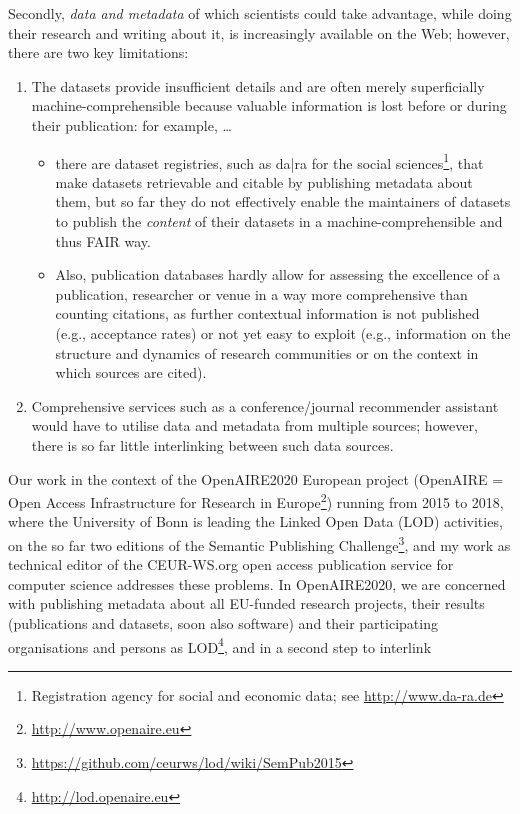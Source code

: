 \documentclass[a4paper,USenglish]{dagrep}
\begin{document}
Secondly, \emph{data and metadata} of which scientists could take advantage,
while doing their research and writing about it, is increasingly available on
the Web; however, there are two key limitations:
\begin{enumerate}
\item The datasets provide insufficient details and are often merely
superficially machine-comprehensible because valuable information is lost before
or during their publication: for example, …
  \begin{itemize}
  \item there are dataset registries, such as da|ra for the social
sciences\footnote{Registration agency for social and economic data; see
\url{http://www.da-ra.de}}, that make datasets retrievable and citable by
publishing metadata about them, but so far they do not effectively enable the
maintainers of datasets to publish the \emph{content} of their datasets in a
machine-comprehensible and thus FAIR way.
  \item Also, publication databases hardly allow for assessing the excellence of
a publication, researcher or venue in a way more comprehensive than counting
citations, as further contextual information is not published (e.g., acceptance
rates) or not yet easy to exploit (e.g., information on the structure and
dynamics of research communities or on the context in which sources are cited).
  \end{itemize}
\item Comprehensive services such as a conference/journal recommender assistant
would have to utilise data and metadata from multiple sources; however, there is
so far little interlinking between such data sources.
\end{enumerate}
Our work in the context of the OpenAIRE2020 European project (OpenAIRE = Open
Access Infrastructure for Research in
Europe\footnote{\url{http://www.openaire.eu}}) running from 2015 to 2018, where
the University of Bonn is leading the Linked Open Data (LOD) activities, on the
so far two editions of the Semantic Publishing
Challenge\footnote{\url{https://github.com/ceurws/lod/wiki/SemPub2015}}, and my
work as technical editor of the CEUR-WS.org open access publication service for
computer science addresses these problems.
In OpenAIRE2020, we are concerned with publishing metadata about all EU-funded
research projects, their results (publications and datasets, soon also software)
and their participating organisations and persons as
LOD\footnote{\url{http://lod.openaire.eu}}, and in a second step to interlink
\end{document}
